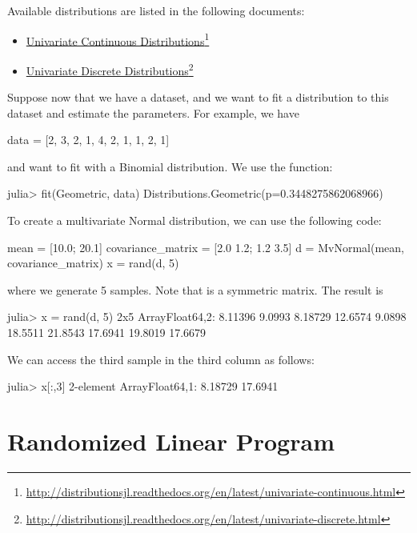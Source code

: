 Available distributions are listed in the following documents:
\begin{itemize}
\item \href{http://distributionsjl.readthedocs.org/en/latest/univariate-continuous.html}{Univariate Continuous Distributions}\footnote{\url{http://distributionsjl.readthedocs.org/en/latest/univariate-continuous.html}}
\item \href{http://distributionsjl.readthedocs.org/en/latest/univariate-discrete.html}{Univariate Discrete Distributions}\footnote{\url{http://distributionsjl.readthedocs.org/en/latest/univariate-discrete.html}}
\end{itemize}

Suppose now that we have a dataset, and we want to fit a distribution to this dataset and estimate the parameters. For example, we have
\begin{code}
data = [2, 3, 2, 1, 4, 2, 1, 1, 2, 1]
\end{code}
\noindent and want to fit with a Binomial distribution. We use the  function:
\begin{code}
julia> fit(Geometric, data)
Distributions.Geometric(p=0.3448275862068966)
\end{code}

To create a multivariate Normal distribution, we can use the following code:
\begin{code}
mean = [10.0; 20.1]
covariance_matrix = [2.0 1.2; 1.2 3.5]
d = MvNormal(mean, covariance_matrix)
x = rand(d, 5)
\end{code}
\noindent where we generate 5 samples. Note that  is a symmetric matrix. The result is
\begin{code}
julia> x = rand(d, 5)
2x5 Array{Float64,2}:
  8.11396   9.0993   8.18729  12.6574   9.0898
 18.5511   21.8543  17.6941   19.8019  17.6679
\end{code}
\noindent We can access the third sample in the third column as follows:
\begin{code}
julia> x[:,3]
2-element Array{Float64,1}:
  8.18729
 17.6941
\end{code}









\section{Randomized Linear Program}

